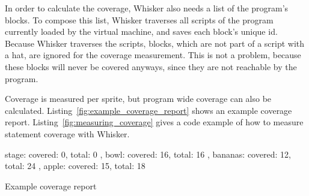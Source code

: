 In order to calculate the coverage, Whisker also needs a list of the program's blocks.
To compose this list, Whisker traverses all scripts of the program currently loaded by the virtual machine,
and saves each block's unique id.
Because Whisker traverses the scripts, blocks, which are not part of a script with a hat,
are ignored for the coverage measurement.
This is not a problem, because these blocks will never be covered anyways,
since they are not reachable by the program.
\parspace

Coverage is measured per sprite, but program wide coverage can also be calculated.
Listing~\ref{fig:example_coverage_report} shows an example coverage report.
Listing~\ref{fig:measuring_coverage} gives a code example of how to measure statement coverage with Whisker.
\parspace

\begin{listing}[htpb]
    \centering

    \begin{minipage}{.5\textwidth}
        \begin{javascriptcode}
            {
                stage: { covered: 0, total: 0 },
                bowl: { covered: 16, total: 16 },
                bananas: { covered: 12, total: 24 },
                apple: { covered: 15, total: 18 }
            }
        \end{javascriptcode}
    \end{minipage}

    \caption{Example coverage report}
    \label{fig:example_coverage_report}
\end{listing}


